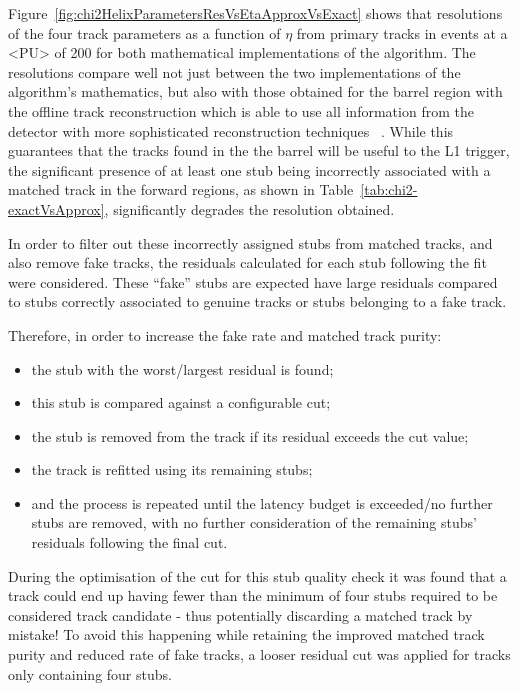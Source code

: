 
Figure~\ref{fig:chi2HelixParametersResVsEtaApproxVsExact} shows that resolutions of the four track parameters as a function of $\eta$ from primary tracks in \ttbar events at a <PU> of 200 for both mathematical implementations of the algorithm.
The resolutions compare well not just between the two implementations of the algorithm's mathematics, but also with those obtained for the barrel region with the offline track reconstruction which is able to use all information from the detector with more sophisticated reconstruction techniques ~\cite{P2TrackerTDR}.
While this guarantees that the tracks found in the the barrel will be useful to the L1 trigger, the significant presence of at least one stub being incorrectly associated with a matched track in the forward regions, as shown in Table~\ref{tab:chi2-exactVsApprox}, significantly degrades the resolution obtained.

In order to filter out these incorrectly assigned stubs from matched tracks, and also remove fake tracks, the residuals calculated for each stub following the fit were considered.
These ``fake'' stubs are expected have large residuals compared to stubs correctly associated to genuine tracks or stubs belonging to a fake track.

Therefore, in order to increase the fake rate and matched track purity:
\begin{itemize}
\item the stub with the worst/largest residual is found;
\item this stub is compared against a configurable cut;
\item the stub is removed from the track if its residual exceeds the cut value;
\item the track is refitted using its remaining stubs;
\item and the process is repeated until the latency budget is exceeded/no further stubs are removed, with no further consideration of the remaining stubs' residuals following the final cut.
\end{itemize}

During the optimisation of the cut for this stub quality check it was found that a track could end up having fewer than the minimum of four stubs required to be considered track candidate - thus potentially discarding a matched track by mistake!
To avoid this happening while retaining the improved matched track purity and reduced rate of fake tracks, a looser residual cut was applied for tracks only containing four stubs.

